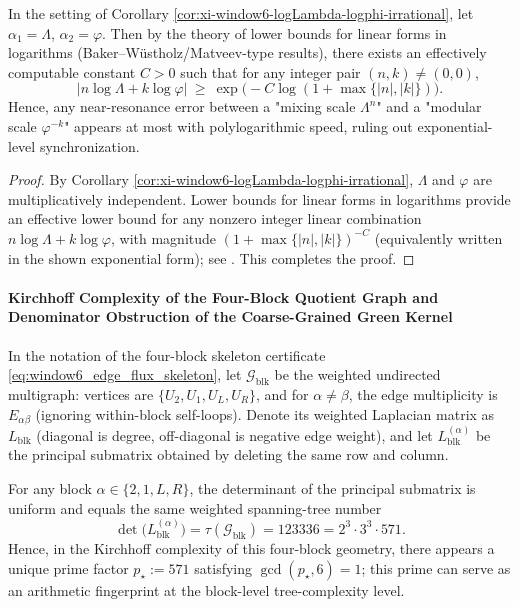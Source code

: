 \begin{proposition}\label{prop:xi-window6-baker-effective-beat-bound}
In the setting of Corollary \ref{cor:xi-window6-logLambda-logphi-irrational}, let \(\alpha_1=\Lambda\), \(\alpha_2=\varphi\).
Then by the theory of lower bounds for linear forms in logarithms (Baker--W\"ustholz/Matveev-type results), there exists an effectively computable constant \(C>0\) such that for any integer pair \((n,k)\neq(0,0)\),
\[
\bigl|n\log\Lambda+k\log\varphi\bigr|
\ \ge\
\exp\!\bigl(-C\log(1+\max\{|n|,|k|\})\bigr).
\]
Hence, any near-resonance error between a "mixing scale \(\Lambda^n\)" and a "modular scale \(\varphi^{-k}\)" appears at most with polylogarithmic speed, ruling out exponential-level synchronization.
\end{proposition}

\begin{proof}
By Corollary \ref{cor:xi-window6-logLambda-logphi-irrational}, \(\Lambda\) and \(\varphi\) are multiplicatively independent.
Lower bounds for linear forms in logarithms provide an effective lower bound for any nonzero integer linear combination \(n\log\Lambda+k\log\varphi\), with magnitude \((1+\max\{|n|,|k|\})^{-C}\) (equivalently written in the shown exponential form); see \cite{BakerWustholz2007LogarithmicForms,Matveev2000LinearFormsLogs}. This completes the proof.
\end{proof}

\paragraph{Kirchhoff Complexity of the Four-Block Quotient Graph and Denominator Obstruction of the Coarse-Grained Green Kernel}
In the notation of the four-block skeleton certificate \eqref{eq:window6_edge_flux_skeleton}, let \(\mathcal{G}_{\mathrm{blk}}\) be the weighted undirected multigraph: vertices are \(\{U_2,U_1,U_L,U_R\}\), and for \(\alpha\neq\beta\), the edge multiplicity is \(E_{\alpha\beta}\) (ignoring within-block self-loops).
Denote its weighted Laplacian matrix as \(L_{\mathrm{blk}}\) (diagonal is degree, off-diagonal is negative edge weight), and let \(L_{\mathrm{blk}}^{(\alpha)}\) be the principal submatrix obtained by deleting the same row and column.

\begin{corollary}[Weighted Spanning-Tree Number Factorization of the window-\(6\) Four-Block Quotient Graph and Audit Prime \texorpdfstring{$p_\star=571$}{p*=571}]\label{cor:xi-window6-block-tree-number-audit-prime}
For any block \(\alpha\in\{2,1,L,R\}\), the determinant of the principal submatrix is uniform and equals the same weighted spanning-tree number
\[
\det\!\bigl(L_{\mathrm{blk}}^{(\alpha)}\bigr)
=\tau(\mathcal{G}_{\mathrm{blk}})
=123336
=2^{3}\cdot 3^{3}\cdot 571.
\]
Hence, in the Kirchhoff complexity of this four-block geometry, there appears a unique prime factor \(p_\star:=571\) satisfying \(\gcd(p_\star,6)=1\); this prime can serve as an arithmetic fingerprint at the block-level tree-complexity level.
\end{corollary}

